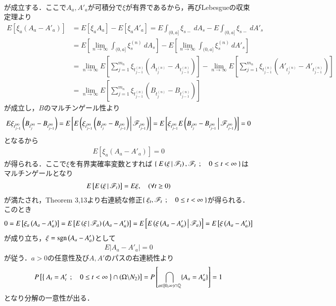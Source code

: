 \begin{prf}[未修正]
\begin{description}
\begin{align}
				\end{align}
				が成立する．ここで$A_a,A'_a$が可積分で$\xi$が有界であるから，再びLebesgueの収束定理より
				\begin{align}
					E\left[ \xi_a\left( A_a - A'_a \right) \right]
					&= E\left[ \xi_a A_a \right] -  E\left[ \xi_a A'_a \right]
					= E \int_{(0,a]} \xi_{s-}\ dA_s - E\int_{(0,a]} \xi_{s-}\ dA'_s \\
					&= E \left[ \lim_{n \to \infty} \int_{(0,a]} \xi^{(n)}_s\ dA_s \right]
						- E \left[ \lim_{n \to \infty} \int_{(0,a]} \xi^{(n)}_s\ dA'_s \right] \\
					&= \lim_{n \to \infty} E\left[ \sum_{j=1}^{m_n}\xi_{t^{(n)}_{j-1}}\left( A_{t^{(n)}_j} - A_{t^{(n)}_{j-1}} \right) \right]
						-  \lim_{n \to \infty} E \left[ \sum_{j=1}^{m_n}\xi_{t^{(n)}_{j-1}}\left( A'_{t^{(n)}_j} - A'_{t^{(n)}_{j-1}} \right) \right] \\
					&= \lim_{n \to \infty} E \left[ \sum_{j=1}^{m_n}\xi_{t^{(n)}_{j-1}}\left( B_{t^{(n)}_j} - B_{t^{(n)}_{j-1}} \right) \right]
				\end{align}
				が成立し，$B$のマルチンゲール性より
				\begin{align}
					E\xi_{t^{(n)}_{j-1}}\left( B_{t^{(n)}_j} - B_{t^{(n)}_{j-1}} \right)
					= E \left[E\left( \xi_{t^{(n)}_{j-1}}\left( B_{t^{(n)}_j} - B_{t^{(n)}_{j-1}} \right) \, \middle|\, \mathscr{F}_{t^{(n)}_{j-1}} \right) \right]
					= E \left[ \xi_{t^{(n)}_{j-1}}E\left( B_{t^{(n)}_j} - B_{t^{(n)}_{j-1}} \, \middle|\, \mathscr{F}_{t^{(n)}_{j-1}} \right) \right]
					= 0 
				\end{align}
				となるから
				\begin{align}
					E\left[ \xi_a\left( A_a - A'_a \right) \right] = 0
				\end{align}
				が得られる．ここで$\xi$を有界実確率変数とすれば
				$\left\{\ E\left( \xi \, \middle|\, \mathscr{F}_t \right),\mathscr{F}_t\ \, ; \quad 0 \leq t < \infty\ \right\}$はマルチンゲールとなり
				\begin{align}
					E\left[ E\left( \xi \, \middle|\, \mathscr{F}_t \right) \right] = E \xi,
					\quad (\forall t \geq 0)
				\end{align}
				が満たされ，Theorem 3,13より右連続な修正$\left\{\ \xi_t,\mathscr{F}_t\ \, ; \quad 0 \leq t < \infty\ \right\}$が得られる．
				このとき
				\begin{align}
					0 = E\left[ \xi_a\left( A_a - A'_a \right) \right]
					= E\left[ E\left( \xi \, \middle|\, \mathscr{F}_a \right)\left( A_a - A'_a \right) \right]
					= E\left[ E\left( \xi\left( A_a - A'_a \right) \, \middle|\, \mathscr{F}_a \right) \right]
					= E\left[ \xi\left( A_a - A'_a \right) \right]
				\end{align}
				が成り立ち，$\xi = \operatorname{sgn}\left( A_a - A'_a \right)$として
				\begin{align}
					E\left| A_a - A'_a \right| = 0
				\end{align}
				が従う．$a > 0$の任意性及び$A,A'$のパスの右連続性より
				\begin{align}
					P\left[ \left\{\ A_t = A'_t\ \, ; \quad 0 \leq t < \infty\ \right\} \cap (\Omega \backslash N_2) \right]
					= P\left[ \bigcap_{a \in [0,\infty) \cap \mathbb{Q}} \{A_a=A'_a\} \right]
					= 1
				\end{align}
				となり分解の一意性が出る．
				

\end{description}
\end{prf}

